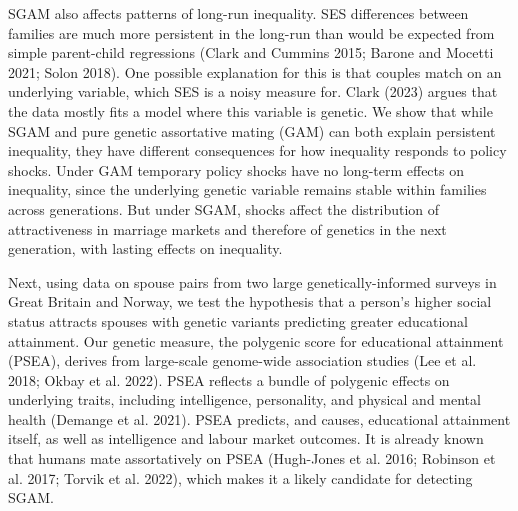 \documentclass[
  12pt,
]{article}
\theoremstyle{definition}
\theoremstyle{definition}
\theoremstyle{definition}
\theoremstyle{definition}
\theoremstyle{remark}
\begin{document}
SGAM also affects patterns of long-run inequality. SES differences
between families are much more persistent in the long-run than would be
expected from simple parent-child regressions
(Clark and Cummins 2015; Barone and Mocetti 2021; Solon 2018). One possible explanation for this is that couples match
on an underlying variable, which SES is a noisy measure for.
Clark (2023) argues that the data mostly fits a model where
this variable is genetic. We show that while SGAM and pure genetic
assortative mating (GAM) can both explain persistent inequality, they
have different consequences for how inequality responds to policy
shocks. Under GAM temporary policy shocks have no long-term effects on
inequality, since the underlying genetic variable remains stable within
families across generations. But under SGAM, shocks affect the
distribution of attractiveness in marriage markets and therefore of
genetics in the next generation, with lasting effects on inequality.

Next, using data on spouse pairs from two large genetically-informed
surveys in Great Britain and Norway, we test the hypothesis that a
person's higher social status attracts spouses with genetic variants
predicting greater educational attainment. Our genetic measure, the
polygenic score for educational attainment (PSEA), derives from
large-scale genome-wide association studies ({Lee et al.} 2018; {Okbay et al.} 2022). PSEA reflects a bundle of polygenic effects on
underlying traits, including intelligence, personality, and physical and
mental health ({Demange et al.} 2021). PSEA predicts, and causes,
educational attainment itself, as well as intelligence and labour market
outcomes. It is already known that humans mate assortatively on PSEA
(Hugh-Jones et al. 2016; {Robinson et al.} 2017; {Torvik et al.} 2022), which
makes it a likely candidate for detecting SGAM.
\end{document}
